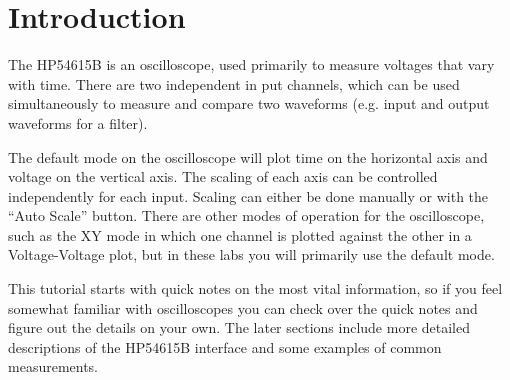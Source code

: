 \documentclass{article}
\begin{document}
\thispagestyle{plain}


\tableofcontents

\section{Introduction}
The HP54615B is an oscilloscope, used primarily to measure voltages that vary with time. There are two independent in put channels, which can be used simultaneously to measure and compare two waveforms (e.g. input and output waveforms for a filter).

The default mode on the oscilloscope will plot time on the horizontal axis and voltage on the vertical axis. The scaling of each axis can be controlled independently for each input. Scaling can either be done manually or with the ``Auto Scale'' button. There are other modes of operation for the oscilloscope, such as the XY mode in which one channel is plotted against the other in a Voltage-Voltage plot, but in these labs you will primarily use the default mode.

This tutorial starts with quick notes on the most vital information, so if you feel somewhat familiar with oscilloscopes you can check over the quick notes and figure out the details on your own. The later sections include more detailed descriptions of the HP54615B interface and some examples of common measurements.
\end{document}
